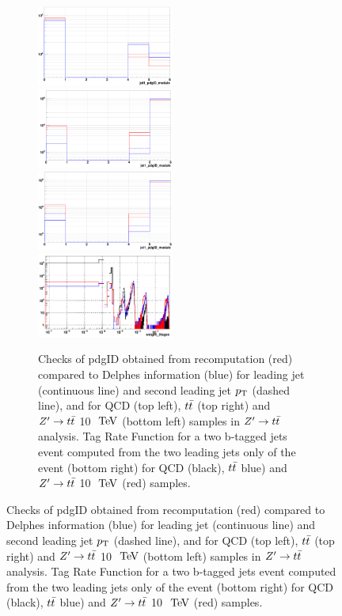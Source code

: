 \documentclass{cernrep}
\begin{document}
\begin{figure}[!htb]
\begin{figure}[!htb]\centering
\includegraphics[width=0.495\textwidth]{Fig/check_TRF/Zptt/jet12pdgID_QCD5f_redModule_blueDELPHES.png}
\includegraphics[width=0.495\textwidth]{Fig/check_TRF/Zptt/jet12pdgID_ttbar_redModule_blueDELPHES.png}
\includegraphics[width=0.495\textwidth]{Fig/check_TRF/Zptt/jet12pdgID_Zptt10TeV_redModule_blueDELPHES.png}
\includegraphics[width=0.495\textwidth]{Fig/check_TRF/Zptt/TRF2tagex_module_redZptt10TeV_blackQCD_bluettbar.png}
\caption{Checks of pdgID obtained from recomputation (red) compared to Delphes information (blue) for leading jet (continuous line) and second leading jet $p\sb{\scriptstyle\mathrm{T}}$ (dashed line), and for QCD (top left), $t\bar{t}$ (top right) and $Z^{\prime} \rightarrow t\bar{t}$ 10 $\TeV$ (bottom left) samples in $Z^{\prime} \rightarrow t\bar{t}$ analysis. Tag Rate Function for a two b-tagged jets event computed from the two leading jets only of the event (bottom right) for QCD (black), $t\bar{t}$ blue) and $Z^{\prime} \rightarrow t\bar{t}$ 10 $\TeV$ (red) samples.}
\label{fig:Zptt_TRFchecks}
\end{figure}


\end{figure}
\end{document}
